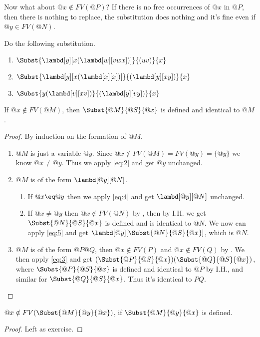 \documentclass[../../../include/open-logic-section]{subfiles}
\begin{document}
Now what about $@x \notin FV(@P)$? If there is no free occurrences
of $@x$ in $@P$, then there is nothing to replace, the substitution does
nothing and it's fine even if $@y \in FV(@N)$.

\begin{prob}
  Do the following substitution.
  \begin{enumerate}
  \item $\Subst{\lambd[y][x(\lambd[w][vwx])]}{(uv)}{x}$
  \item $\Subst{\lambd[y][x(\lambd[x][x])]}{(\lambd[y][xy])}{x}$
  \item $\Subst{y(\lambd[v][xv])}{(\lambd[y][vy])}{x}$
  \end{enumerate}
\end{prob}

\begin{thm}
  If $@x \notin FV(@M)$, then $\Subst{@M}{@S}{@x}$ is defined and identical to $@M$.
\end{thm}
\begin{proof}
  By induction on the formation of $@M$.
  \begin{enumerate}
  \item[\rule{VAR}] $@M$ is just a variable $@y$. Since $@x \notin
    FV(@M)=FV(@y)=\{@y\}$ we know $@x \neq @y$. Thus we apply
    \eqref{eq:2} and get $@y$ unchanged.
  \item[\rule{ABS}] $@M$ is of the form $\lambd[@y][@N]$. 
    \begin{enumerate}
    \item If $@x \eq @y$ then we apply \eqref{eq:4} and get $\lambd[@y][@N]$
      unchanged.
    \item If $@x \neq @y$ then $@x \notin FV(@N)$ by
      , then by I.H. we get $\Subst{@N}{@S}{@x}$
      is defined and is identical to $@N$. We now can apply
      \eqref{eq:5} and get $\lambd[@y][\Subst{@N}{@S}{@x}]$, which
      is $@N$.
    \end{enumerate}
  \item[\rule{APP}] $@M$ is of the form $@P@Q$, then $@x \notin
    FV(P)$ and $@x \notin FV(Q)$ by . We then
    apply \eqref{eq:3} and get
    $(\Subst{@P}{@S}{@x})(\Subst{@Q}{@S}{@x})$, where
    $\Subst{@P}{@S}{@x}$ is defined and identical to $@P$ by I.H.,
    and similar for $\Subst{@Q}{@S}{@x}$. Thus it's identical to $PQ$.
  \end{enumerate}
\end{proof}

\begin{thm}
  $@x \notin FV(\Subst{@M}{@y}{@x})$, if $\Subst{@M}{@y}{@x}$ is defined.
\end{thm}
\begin{proof}
  Left as exercise.
\end{proof}
\end{document}
